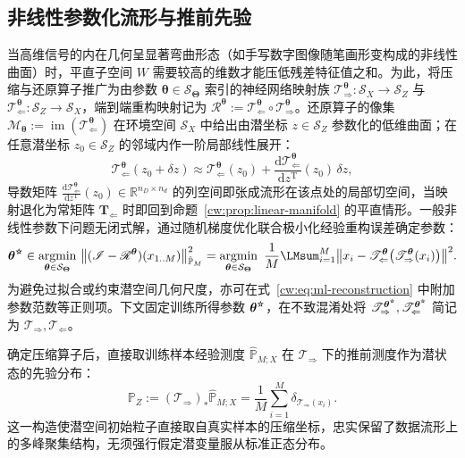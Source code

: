 \subsection{非线性参数化流形与推前先验}

当高维信号的内在几何呈显著弯曲形态（如手写数字图像随笔画形变构成的非线性曲面）时，平直子空间 $W$ 需要较高的维数才能压低残差特征值之和。为此，将压缩与还原算子推广为由参数 $\bm\theta\in\mathcal S_{\bm\Theta}$ 索引的神经网络映射族 $\mathscr T_{\Rightarrow}^{\bm\theta}:\mathcal S_X\to\mathcal S_Z$ 与 $\mathscr T_{\Leftarrow}^{\bm\theta}:\mathcal S_Z\to\mathcal S_X$，端到端重构映射记为 $\mathscr R^{\bm\theta}:=\mathscr T_{\Leftarrow}^{\bm\theta}\circ\mathscr T_{\Rightarrow}^{\bm\theta}$。还原算子的像集 $\mathcal M_{\bm\theta}:=\operatorname{im}(\mathscr T_{\Leftarrow}^{\bm\theta})$ 在环境空间 $\mathcal S_X$ 中给出由潜坐标 $z\in\mathcal S_Z$ 参数化的低维曲面；在任意潜坐标 $z_0\in\mathcal S_Z$ 的邻域内作一阶局部线性展开：
\begin{equation}\label{cw:eq:manifold-tangent}
\mathscr T_{\Leftarrow}^{\bm\theta}(z_0+\delta z)
\approx\mathscr T_{\Leftarrow}^{\bm\theta}(z_0)
+\frac{\mathrm d\mathscr T_{\Leftarrow}^{\bm\theta}}{\mathrm dz^{\mathrm T}}(z_0)\,\delta z,
\end{equation}
导数矩阵 $\frac{\mathrm d\mathscr T_{\Leftarrow}^{\bm\theta}}{\mathrm dz^{\mathrm T}}(z_0)\in\mathbb R^{n_D\times n_d}$ 的列空间即张成流形在该点处的局部切空间，当映射退化为常矩阵 $\bm T_{\Leftarrow}$ 时即回到命题~\ref{cw:prop:linear-manifold} 的平直情形。一般非线性参数下问题无闭式解，通过随机梯度优化联合极小化经验重构误差确定参数：
\begin{equation}\label{cw:eq:ml-reconstruction}
\bm\theta^{\optstar}\in\operatorname*{argmin}_{\bm\theta\in\mathcal S_{\bm\Theta}}\
\bigl\|(\mathscr I-\mathscr R^{\bm\theta})(x_{1..M})\bigr\|_{\hat{\mathbb P}_M}^2
=\operatorname*{argmin}_{\bm\theta\in\mathcal S_{\bm\Theta}}\
\frac1M\sum_{i=1}^M\bigl\|x_i-\mathscr T_{\Leftarrow}^{\bm\theta}\bigl(\mathscr T_{\Rightarrow}^{\bm\theta}(x_i)\bigr)\bigr\|^2.
\end{equation}
为避免过拟合或约束潜空间几何尺度，亦可在式~\eqref{cw:eq:ml-reconstruction} 中附加参数范数等正则项。下文固定训练所得参数 $\bm\theta^{\optstar}$，在不致混淆处将 $\mathscr T_{\Rightarrow}^{\bm\theta^{\optstar}},\mathscr T_{\Leftarrow}^{\bm\theta^{\optstar}}$ 简记为 $\mathscr T_{\Rightarrow},\mathscr T_{\Leftarrow}$。

确定压缩算子后，直接取训练样本经验测度 $\hat{\mathbb P}_{M;X}$ 在 $\mathscr T_{\Rightarrow}$ 下的推前测度作为潜状态的先验分布：
\begin{equation}\label{cw:eq:ml-prior}
\mathbb P_Z:=(\mathscr T_{\Rightarrow})_*\hat{\mathbb P}_{M;X}
=\frac1M\sum_{i=1}^M\delta_{\mathscr T_{\Rightarrow}(x_i)}.
\end{equation}
这一构造使潜空间初始粒子直接取自真实样本的压缩坐标，忠实保留了数据流形上的多峰聚集结构，无须强行假定潜变量服从标准正态分布。

